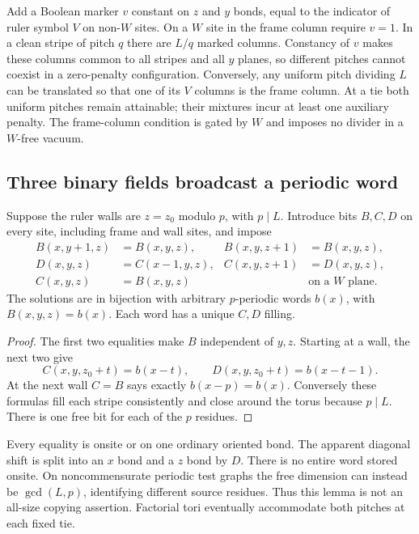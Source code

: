 Add a Boolean marker $v$ constant on $z$ and $y$ bonds, equal to the
indicator of ruler symbol $V$ on non-$W$ sites. On a $W$ site in the
frame column require $v=1$. In a clean stripe of pitch $q$ there are
$L/q$ marked columns. Constancy of $v$ makes these columns common to
all stripes and all $y$ planes, so different pitches cannot coexist
in a zero-penalty configuration. Conversely, any uniform pitch
dividing $L$ can be translated so that one of its $V$ columns is the
frame column. At a tie both uniform pitches remain attainable; their
mixtures incur at least one auxiliary penalty. The frame-column
condition is gated by $W$ and imposes no divider in a $W$-free vacuum.

\subsection{Three binary fields broadcast a periodic word}
\begin{lemma}\label{lem:bulk-broadcast}
Suppose the ruler walls are $z=z_0$ modulo $p$, with $p\mid L$.
Introduce bits $B,C,D$ on every site, including frame and wall sites,
and impose
\begin{align*}
 B(x,y+1,z)&=B(x,y,z),& B(x,y,z+1)&=B(x,y,z),\\
 D(x,y,z)&=C(x-1,y,z),& C(x,y,z+1)&=D(x,y,z),\\
 C(x,y,z)&=B(x,y,z)&&\text{on a }W\text{ plane}.
\end{align*}
The solutions are in bijection with arbitrary $p$-periodic words
$b(x)$, with $B(x,y,z)=b(x)$. Each word has a unique $C,D$ filling.
\end{lemma}
\begin{proof}
The first two equalities make $B$ independent of $y,z$. Starting at a
wall, the next two give
\[
 C(x,y,z_0+t)=b(x-t),\qquad D(x,y,z_0+t)=b(x-t-1).
\]
At the next wall $C=B$ says exactly $b(x-p)=b(x)$. Conversely these
formulas fill each stripe consistently and close around the torus
because $p\mid L$. There is one free bit for each of the $p$ residues.
\end{proof}

Every equality is onsite or on one ordinary oriented bond. The apparent
diagonal shift is split into an $x$ bond and a $z$ bond by $D$.
There is no entire word stored onsite. On noncommensurate periodic
test graphs the free dimension can instead be $\gcd(L,p)$, identifying
different source residues. Thus this lemma is not an all-size copying
assertion. Factorial tori eventually accommodate both pitches at
each fixed tie.

